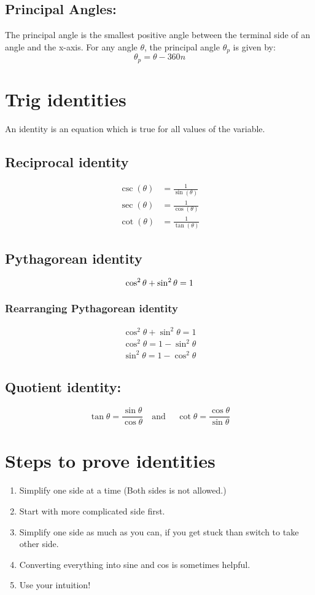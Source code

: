 \documentclass{article}
\begin{document}
\subsection{Principal Angles:}
The principal angle is the smallest positive angle between the terminal side of an angle and the x-axis. For any angle $\theta$, the principal angle $\theta_p$ is given by:
\[ \theta_p = \theta - 360n \]
\newpage
\section{Trig identities}
An identity is an equation which is true for all values of the variable. 
\subsection{Reciprocal identity}
\begin{align*}
\csc(\theta) &= \frac{1}{\sin(\theta)} \\
\sec(\theta) &= \frac{1}{\cos(\theta)} \\
\cot(\theta) &= \frac{1}{\tan(\theta)}
\end{align*}
\subsection{Pythagorean identity}

$$\cos^2\theta +\sin^2\theta =1\\$$

\subsubsection*{Rearranging Pythagorean identity}
\begin{align*}
    \cos^2\theta +\sin^2\theta =1\\
    \cos^2\theta =1-\sin^2\theta\\
    \sin^2\theta=1-\cos^2\theta
\end{align*}
\subsection{Quotient identity:}
\[\tan\theta =\frac{\sin \theta}{\cos \theta} \quad \text{and } \quad \cot\theta=\frac{\cos\theta}{\sin\theta}\]
\section*{Steps to prove identities}
\begin{enumerate}
    \item Simplify one side at a time (Both sides is not allowed.)
    \item Start with more complicated side first.
    \item Simplify one side as much as you can, if you get stuck than switch to take other side.
    \item Converting everything into sine and cos is sometimes helpful.
    \item Use your intuition!
\end{enumerate}
\end{document}
